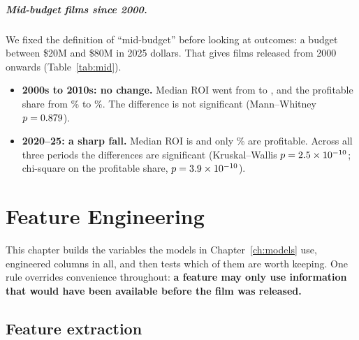 \documentclass[a4paper,12pt]{report}
\newcommand{\tablein}[1]{}
\begin{document}
\paragraph{Mid-budget films since 2000.} We fixed the definition of ``mid-budget'' before looking at outcomes: a budget between \$20M and \$80M in 2025 dollars. That gives \MultiMidN{} films released from 2000 onwards (Table~\ref{tab:mid}).
\begin{itemize}
  \item \textbf{2000s to 2010s: no change.} Median ROI went from \MultiMidRoiTwoZeroZeroZeros{} to \MultiMidRoiTwoZeroOneZeros{}, and the profitable share from \MultiMidPctProfTwoZeroZeroZeros\% to \MultiMidPctProfTwoZeroOneZeros\%. The difference is not significant (Mann--Whitney $p=0.879$).
  \item \textbf{2020--25: a sharp fall.} Median ROI is \MultiMidRoiTwoZeroTwoZeros{} and only \MultiMidPctProfTwoZeroTwoZeros\% are profitable. Across all three periods the differences are significant (Kruskal--Wallis $p=2.5\times10^{-10}$; chi-square on the profitable share, $p=3.9\times10^{-10}$).
\end{itemize}

\begin{table}[htbp]
\centering\small
\tablein{tab3_4_mid_budget}
\caption{Mid-budget films (\$20M--\$80M in 2025 dollars) by period. Flat from the 2000s to the 2010s; a sharp fall in 2020--25.}
\label{tab:mid}
\end{table}

\chapter{Feature Engineering}\label{ch:features}

This chapter builds the variables the models in Chapter~\ref{ch:models} use, \FeatNEngineered{} engineered columns in all, and then tests which of them are worth keeping. One rule overrides convenience throughout: \textbf{a feature may only use information that would have been available before the film was released.}

\section{Feature extraction}
\end{document}
